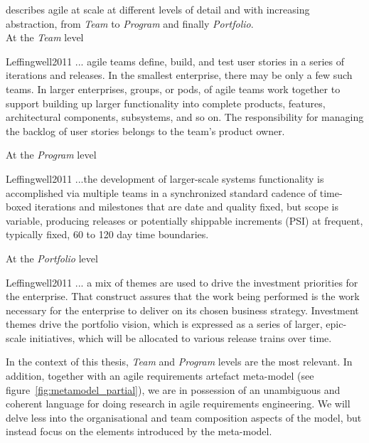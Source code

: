 \documentclass[dissertation,final]{softeng}
\begin{document}
\citeauthor{Leffingwell2011} describes agile at scale at different levels of detail and with increasing abstraction, from \emph{Team} to \emph{Program} and finally \emph{Portfolio}. \\

At the \emph{Team} level
\begin{displaycquote}{Leffingwell2011}
... agile teams define, build, and test user stories in a series of iterations and releases. In the smallest enterprise, there may be only a few such teams. In larger enterprises, groups, or pods, of agile teams work together to support building up larger functionality into complete products, features, architectural components, subsystems, and so on. The responsibility for managing the backlog of user stories belongs to the team's product owner. 
\end{displaycquote}

At the \emph{Program} level
\begin{displaycquote}{Leffingwell2011}
...the development of larger-scale systems functionality is accomplished via multiple teams in a synchronized standard cadence of time-boxed iterations and milestones that are date and quality fixed, but scope is variable, producing releases or potentially shippable increments (PSI) at frequent, typically fixed, 60 to 120 day time boundaries.
\end{displaycquote}

At the \emph{Portfolio} level
\begin{displaycquote}{Leffingwell2011}
... a mix of themes are used to drive the investment priorities for the enterprise. That construct assures that the work being performed is the work necessary for the enterprise to deliver on its chosen business strategy. Investment themes drive the portfolio vision, which is expressed as a series of larger, epic-scale initiatives, which will be allocated to various release trains over time.
\end{displaycquote}

In the context of this thesis, \emph{Team} and \emph{Program} levels are the most relevant. In addition, together with an agile requirements artefact meta-model (see figure~\ref{fig:metamodel_partial}), we are in possession of an unambiguous and coherent language for doing research in agile requirements engineering. We will delve less into the organisational and team composition aspects of the model, but instead focus on the elements introduced by the meta-model.
\end{document}
